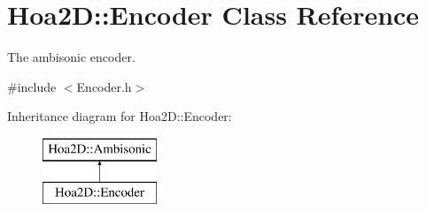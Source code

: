 \hypertarget{class_hoa2_d_1_1_encoder}{\section{Hoa2\-D\-:\-:Encoder Class Reference}
\label{class_hoa2_d_1_1_encoder}
}


The ambisonic encoder.  




{\ttfamily \#include $<$Encoder.\-h$>$}

Inheritance diagram for Hoa2\-D\-:\-:Encoder\-:\begin{figure}[H]
\begin{center}
\leavevmode
\includegraphics[height=2.000000cm]{class_hoa2_d_1_1_encoder}
\end{center}
\end{figure}
